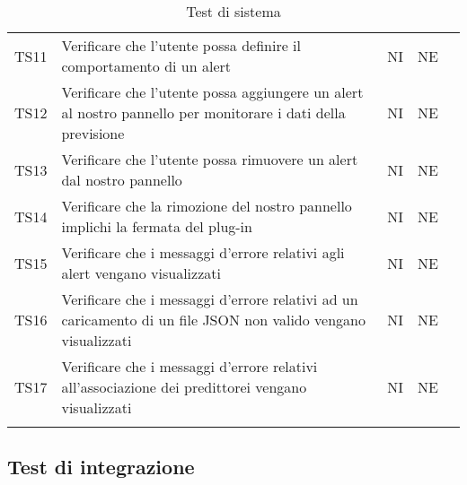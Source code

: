 \begin{longtable} {
		>{}p{15mm} 
		>{}p{79.5mm}
		>{}p{15mm} 
		>{}p{15mm}
		>{}p{0mm}}
	TS11 & Verificare che l'utente possa definire il comportamento di un alert & NI & NE  &\TBstrut \\ [2mm]
	TS12 & Verificare che l'utente possa aggiungere un alert al nostro pannello per monitorare i dati della previsione & NI & NE  &\TBstrut \\ [2mm]
	TS13 & Verificare che l'utente possa rimuovere un alert dal nostro pannello & NI & NE  &\TBstrut \\ [2mm]
	TS14 & Verificare che la rimozione del nostro pannello implichi la fermata del plug-in & NI & NE  &\TBstrut \\ [2mm]
	TS15 & Verificare che i messaggi d'errore relativi agli alert vengano visualizzati & NI & NE  &\TBstrut \\ [2mm]
	TS16 & Verificare che i messaggi d'errore relativi ad un caricamento di un file JSON non valido vengano visualizzati & NI & NE  &\TBstrut \\ [2mm]
	TS17 & Verificare che i messaggi d'errore relativi all'associazione dei predittorei vengano visualizzati & NI & NE  &\TBstrut \\ [2mm]
	\rowcolor{white}
	\caption{Test di sistema}
\end{longtable}


\subsection{Test di integrazione}

